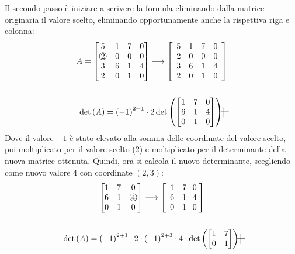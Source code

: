 \documentclass[a4paper]{article}
\makeatletter
\newcommand{\MyTikzmark}[2]{%
	\tikz[overlay,remember picture,baseline] \node [anchor=base] (#1) {#2};%
}
\newcommand{\DrawVLine}[3][]{%
	\begin{tikzpicture}[overlay,remember picture]
		\draw[shorten <=0.3ex, #1] (#2.north) -- (#3.south);
	\end{tikzpicture}
}
\newcommand{\DrawHLine}[3][]{%
	\begin{tikzpicture}[overlay,remember picture]
		\draw[shorten <=0.2em, #1] (#2.west) -- (#3.east);
	\end{tikzpicture}
}
\newcommand{\circledtext}[1]{\raisebox{.5pt}{\textcircled{\raisebox{-.9pt}{#1}}}}
\newenvironment{rowequmatbra}[1]{\left[\array{@{}#1@{}}}{\endarray\right]}
\makeatother
\begin{document}
	\noindent
	Il \textcolor{Red3}{secondo passo} è iniziare a scrivere la formula eliminando dalla matrice originaria il valore scelto, eliminando opportunamente anche la rispettiva riga e colonna:
	\begin{gather*}
		A = \begin{bmatrix}
			5 & 1 & 7 & 0 \\
			\circledtext{2} & 0 & 0 & 0 \\
			3 & 6 & 1 & 4 \\
			2 & 0 & 1 & 0
		\end{bmatrix} \longrightarrow
		\begin{rowequmatbra}{cccc}
			\phantom{0}\MyTikzmark{s_col}{5} & 1 & 7 & 0\phantom{0} \\
			\phantom{0}\MyTikzmark{s_row}{2} & 0 & 0 & \MyTikzmark{f_row}{0}\phantom{0} \\
			\phantom{0}3 & 6 & 1 & 4\phantom{0} \\
			\phantom{0}\MyTikzmark{f_col}{2} & 0 & 1 & 0\phantom{0}
		\end{rowequmatbra} \\
		\\
		\det\left(A\right) = \left(-1\right)^{2+1} \cdot 2 \det\left(\begin{bmatrix}
			1 & 7 & 0 \\
			6 & 1 & 4 \\
			0 & 1 & 0
		\end{bmatrix}\right)
		\DrawHLine{s_row}{f_row}
		\DrawVLine{s_col}{f_col}
	\end{gather*}
	Dove il valore $-1$ è stato elevato alla somma delle coordinate del valore scelto, poi moltiplicato per il valore scelto ($2$) e moltiplicato per il determinante della nuova matrice ottenuta. Quindi, ora si calcola il nuovo determinante, scegliendo come nuovo valore $4$ con coordinate $\left(2,3\right)$:
	\begin{gather*}
		\begin{bmatrix}
			1 & 7 & 0 \\
			6 & 1 & \circledtext{4} \\
			0 & 1 & 0
		\end{bmatrix} \longrightarrow
		\begin{rowequmatbra}{ccc}
			\phantom{0}1 & 7 & \MyTikzmark{s_col}{0}\phantom{0} \\
			\phantom{0}\MyTikzmark{s_row}{6} & 1 & \MyTikzmark{f_row}{4}\phantom{0} \\
			\phantom{0}0 & 1 & \MyTikzmark{f_col}{0}\phantom{0}
		\end{rowequmatbra} \\
		\\
		\det\left(A\right) = \left(-1\right)^{2+1} \cdot 2 \cdot \left(-1\right)^{2+3} \cdot 4 \cdot \det\left(\begin{bmatrix}
			1 & 7 \\
			0 & 1
		\end{bmatrix}\right)
		\DrawHLine{s_row}{f_row}
		\DrawVLine{s_col}{f_col}
	\end{gather*}
\end{document}

